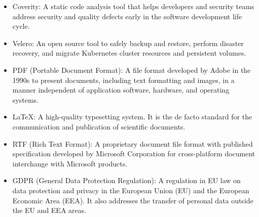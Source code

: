 \begin{itemize}
    \item Coverity: A static code analysis tool that helps developers and security teams address security and quality defects early in the software development life cycle.

    \item Velero: An open source tool to safely backup and restore, perform disaster recovery, and migrate Kubernetes cluster resources and persistent volumes.

    \item PDF (Portable Document Format): A file format developed by Adobe in the 1990s to present documents, including text formatting and images, in a manner independent of application software, hardware, and operating systems.
    \item LaTeX: A high-quality typesetting system. It is the de facto standard for the communication and publication of scientific documents.
    \item RTF (Rich Text Format): A proprietary document file format with published specification developed by Microsoft Corporation for cross-platform document interchange with Microsoft products.
    \item GDPR (General Data Protection Regulation): A regulation in EU law on data protection and privacy in the European Union (EU) and the European Economic Area (EEA). It also addresses the transfer of personal data outside the EU and EEA areas.
    
\end{itemize}